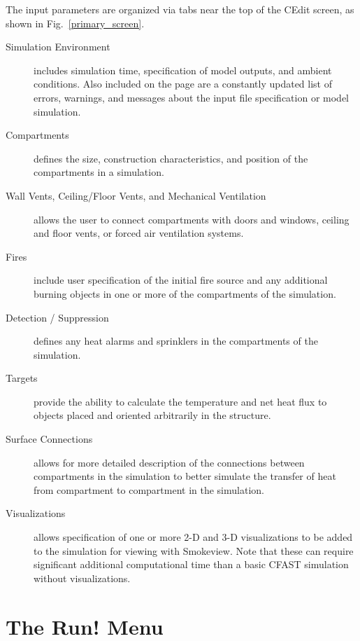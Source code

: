 The input parameters are organized via tabs near the top of the CEdit screen, as shown in Fig.~\ref{primary_screen}.
\begin{description}
\item[Simulation Environment] includes simulation time, specification of model outputs, and ambient conditions. Also included on the page are a constantly updated list of errors, warnings, and messages about the input file specification or model simulation.
\item[Compartments] defines the size, construction characteristics, and position of the compartments in a simulation.
\item[Wall Vents, Ceiling/Floor Vents, and Mechanical Ventilation] allows the user to connect compartments with doors and windows, ceiling and floor vents, or forced air ventilation systems.
\item[Fires] include user specification of the initial fire source and any additional burning objects in one or more of the compartments of the simulation.
\item[Detection / Suppression] defines any heat alarms and sprinklers in the compartments of the simulation.
\item[Targets] provide the ability to calculate the temperature and net heat flux to objects placed and oriented arbitrarily in the structure.
\item[Surface Connections] allows for more detailed description of the connections between compartments in the simulation to better simulate the transfer of heat from compartment to compartment in the simulation.
\item[Visualizations] allows specification of one or more 2-D and 3-D visualizations to be added to the simulation for viewing with Smokeview. Note that these can require significant additional computational time than a basic CFAST simulation without visualizations.
\end{description}


\section{The Run! Menu}

